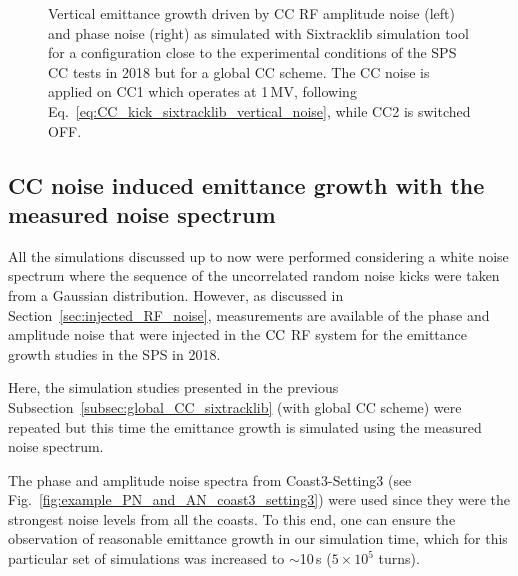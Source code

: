\begin{figure}[htp]
\begin{subfigure}{.45\textwidth}
    \end{subfigure}
    \caption{Vertical emittance growth driven by CC RF amplitude noise (left) and phase noise (right) as simulated with Sixtracklib simulation tool for a configuration close to the experimental conditions of the SPS CC tests in 2018 but for a global CC scheme. The CC noise is applied on CC1 which operates at 1\,MV, following Eq.~\eqref{eq:CC_kick_sixtracklib_vertical_noise}, while CC2 is switched OFF.}
    \label{fig:study_3_sixtracklib_global_cc_scheme}
\end{figure}

\subsection{CC noise induced emittance growth with the measured noise spectrum}\label{subsec:global_CC_sixtracklib_noiseCoast3_setting3}
All the simulations discussed up to now were performed considering a white noise spectrum where the sequence of the uncorrelated random noise kicks were taken from a Gaussian distribution. However, as discussed in Section~\ref{sec:injected_RF_noise}, measurements are available of the phase and amplitude noise that were injected in the ${\mathrm{CC}}$ RF system for the emittance growth studies in the SPS in 2018. 

Here, the simulation studies presented in the previous Subsection~\ref{subsec:global_CC_sixtracklib} (with global CC scheme) were repeated but this time the emittance growth is simulated using the measured noise spectrum. 

The phase and amplitude noise spectra from Coast3-Setting3 (see Fig.~\ref{fig:example_PN_and_AN_coast3_setting3}) were used since they were the strongest noise levels from all the coasts. To this end, one can ensure the observation of reasonable emittance growth in our simulation time, which for this particular set of simulations was increased to $\sim$10\,s ($5\times 10^{5}$ turns).


